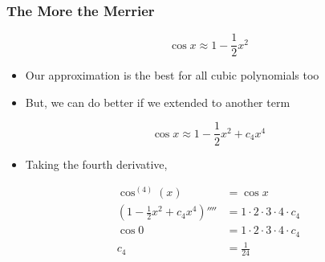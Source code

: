 \documentclass{beamer}
\begin{document}
\begin{frame}
  \frametitle{The More the Merrier}
  \begin{equation*}
    \cos x \approx 1 - \frac{1}{2}x^2
  \end{equation*}
  \begin{itemize}
    \item Our approximation is the best for all cubic polynomials too
    \item But, we can do better if we extended to another term
  \end{itemize}
  \begin{equation*}
    \cos x \approx 1 - \frac{1}{2}x^2 + c_4x^4
  \end{equation*}
  \begin{itemize}
    \item Taking the fourth derivative,
  \end{itemize}
  \begin{align*}
    \cos^{(4)}(x) &= \cos x \\
    \left(1 - \frac{1}{2}x^2 + c_4x^4\right)'''' &= 1 \cdot 2 \cdot 3 \cdot 4 \cdot c_4 \\
    \cos 0 & = 1 \cdot 2 \cdot 3 \cdot 4 \cdot c_4 \\
    c_4 & = \frac{1}{24}
  \end{align*}
\end{frame}

\end{document}

